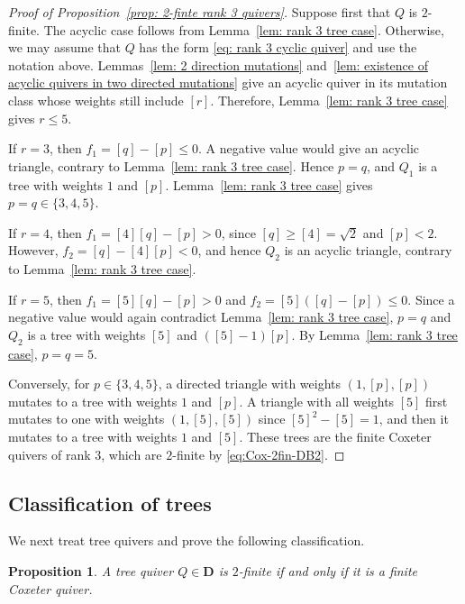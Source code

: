 \documentclass[11pt,reqno]{amsart}
\numberwithin{equation}{section}
\theoremstyle{definition}
\theoremstyle{plain}
\newtheorem{proposition}[example]{Proposition}
\newcommand{\D}{\mathbf{D}}
\newcommand{\bra}[1]{\left[#1\right]}
\begin{document}
	\begin{proof}[Proof of Proposition~\ref{prop: 2-finte rank 3 quivers}]
		Suppose first that $Q$ is $2$-finite. The acyclic case follows from Lemma~\ref{lem: rank 3 tree case}. Otherwise, we may assume that $Q$ has the form \eqref{eq: rank 3 cyclic quiver} and use the notation above. Lemmas~\ref{lem: 2 direction mutations} and~\ref{lem: existence of acyclic quivers in two directed mutations} give an acyclic quiver in its mutation class whose weights still include $\bra{r}$. Therefore, Lemma~\ref{lem: rank 3 tree case} gives $r\leq5$.
		
		If $r=3$, then $f_1=\bra{q}-\bra{p}\leq0$. A negative value would give an acyclic triangle, contrary to Lemma~\ref{lem: rank 3 tree case}. Hence $p=q$, and $Q_1$ is a tree with weights $1$ and $\bra{p}$. Lemma~\ref{lem: rank 3 tree case} gives $p=q\in\{3,4,5\}$.
		
		If $r=4$, then $f_1=\bra{4}\bra{q}-\bra{p}>0$, since $\bra{q}\geq\bra{4}=\sqrt2$ and $\bra{p}<2$. However, $f_2=\bra{q}-\bra{4}\bra{p}<0$, and hence $Q_2$ is an acyclic triangle, contrary to Lemma~\ref{lem: rank 3 tree case}.
		
		If $r=5$, then $f_1=\bra{5}\bra{q}-\bra{p}>0$ and $f_2=\bra{5}(\bra{q}-\bra{p})\leq0$. Since a negative value would again contradict Lemma~\ref{lem: rank 3 tree case}, $p=q$ and $Q_2$ is a tree with weights $\bra{5}$ and $(\bra{5}-1)\bra{p}$. By Lemma~\ref{lem: rank 3 tree case}, $p=q=5$.
		
		Conversely, for $p\in\{3,4,5\}$, a directed triangle with weights $(1,\bra{p},\bra{p})$ mutates to a tree with weights $1$ and $\bra{p}$. A triangle with all weights $\bra{5}$ first mutates to one with weights $(1,\bra{5},\bra{5})$ since $\bra{5}^2-\bra{5}=1$, and then it mutates to a tree with weights $1$ and $\bra{5}$. These trees are the finite Coxeter quivers of rank $3$, which are $2$-finite by \eqref{eq:Cox-2fin-DB2}.
	\end{proof}

\subsection{Classification of trees}
	We next treat tree quivers and prove the following classification.
	
	\begin{proposition}\label{prop: tree Coxeter quivers and 2-finite}
		A tree quiver $Q\in\D$ is $2$-finite if and only if it is a finite Coxeter quiver.
	\end{proposition}
	
\end{document}
